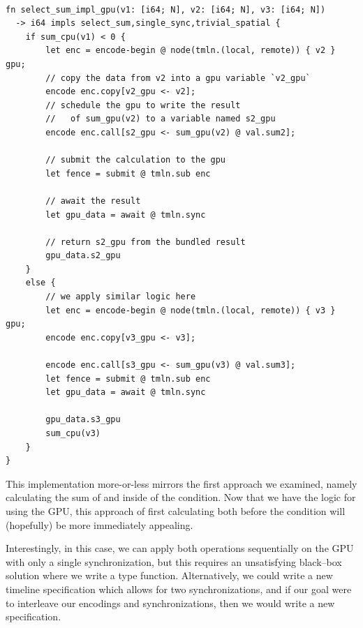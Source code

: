 \begin{lstlisting}

fn select_sum_impl_gpu(v1: [i64; N], v2: [i64; N], v3: [i64; N]) 
  -> i64 impls select_sum,single_sync,trivial_spatial {
    if sum_cpu(v1) < 0 {
        let enc = encode-begin @ node(tmln.(local, remote)) { v2 } gpu;
        // copy the data from v2 into a gpu variable `v2_gpu`
        encode enc.copy[v2_gpu <- v2];
        // schedule the gpu to write the result 
        //   of sum_gpu(v2) to a variable named s2_gpu
        encode enc.call[s2_gpu <- sum_gpu(v2) @ val.sum2];
        
        // submit the calculation to the gpu
        let fence = submit @ tmln.sub enc
        
        // await the result
        let gpu_data = await @ tmln.sync
        
        // return s2_gpu from the bundled result
        gpu_data.s2_gpu
    }
    else {
        // we apply similar logic here
        let enc = encode-begin @ node(tmln.(local, remote)) { v3 } gpu;
        encode enc.copy[v3_gpu <- v3];
        
        encode enc.call[s3_gpu <- sum_gpu(v3) @ val.sum3];
        let fence = submit @ tmln.sub enc
        let gpu_data = await @ tmln.sync
        
        gpu_data.s3_gpu
        sum_cpu(v3)
    }
}
\end{lstlisting}
%
This implementation more-or-less mirrors the first approach we examined, namely calculating the sum of  and  inside of the condition.  Now that we have the logic for using the GPU, this approach of first calculating both before the condition will (hopefully) be more immediately appealing.

Interestingly, in this case, we can apply both operations sequentially on the GPU with only a single synchronization, but this requires an unsatisfying black--box solution where we write a  type function.  Alternatively, we could write a new timeline specification which allows for two synchronizations, and if our goal were to interleave our encodings and synchronizations, then we would write a new specification.

